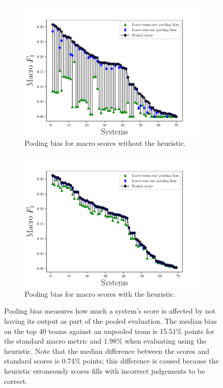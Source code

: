 \begin{figure}[t]
  \begin{subfigure}{\columnwidth}
  \includegraphics[width=\columnwidth]{figures/pooling-bias}
  \caption{Pooling bias for macro \fone{} scores without the \anydoc{} heuristic.}
  \end{subfigure}
  \begin{subfigure}{\columnwidth}
  \includegraphics[width=\columnwidth]{figures/pooling-bias-anydoc}
  \caption{Pooling bias for macro \fone{} scores with the \anydoc{} heuristic.}
  \end{subfigure}
  \caption{\label{fig:pooling-bias} Pooling bias measures how much a system's score is affected by not having its output as part of the pooled evaluation.
  The median bias on the top 40 teams against an unpooled team is 15.51\% points for the standard macro \fone{} metric and 1.98\% when evaluating using the \anydoc{} heuristic.
  Note that the median difference between the \anydoc{} scores and standard scores is 0.74\% points; this difference is caused because the \anydoc{} heuristic erroneously scores fills with incorrect judgements to be correct.}
\end{figure}

